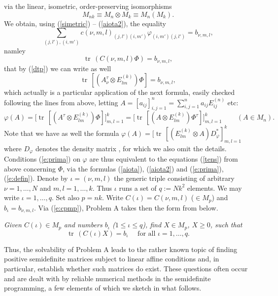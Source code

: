 \documentclass[12pt]{amsart}
\theoremstyle{definition}
\begin{document}
  via the linear, isometric, order-preserving isomorphisms $$ M_{nk}\equiv M_n \otimes M_k \equiv M_n (M_k ).$$
 We obtain, using (\ref{simetric}) -- (\ref{aiota2}), the equality
$$
\sum_{(j,l'),(i,m')}c(\nu ,m,l)_{(j,l')(i,m')}\varphi_{(i,m')(j,l')}=b_{\nu ,m,l},
$$
namley
$${\operatorname{tr}}\, (C(\nu ,m,l)\Phi )=b_{\nu ,m,l},
$$
that by  (\ref{dtp}) we can  write as well 
\begin{equation}\label{tens}
{\operatorname{tr}}\, [(A_{\nu}^\tau \otimes   E_{lm}^{(k)})\Phi ]=b_{\nu , m,l},
\end{equation}
which  actually is a particular application of the next formula, easily checked following the lines from above, 
letting $A=[a_{ij}]_{i,j=1}^n =\sum_{i,j=1}^n a_{ij}E_{ij}^{(n)}$ etc:
\begin{equation}\label{formm}
\varphi (A)=\big[ {\operatorname{tr}}\, [(A^\tau \otimes   E_{lm}^{(k)}){\Phi} ]\big]_{m,l=1}^k   =
\big[ {\operatorname{tr}}\, [(A \otimes   E_{lm}^{(k)}){\Phi^\tau} ]\big]_{m,l=1}^k 
 \, \mbox{ }\mbox{ }\mbox{ }(A\in M_n ).
\end{equation}
 Note that  we have  as well the formula $\varphi (A)=   [{\operatorname{tr}}\, [(E_{lm}^{(k)}\otimes A)D_{\varphi}^* ]_{m,l=1}^k$ where $D_\varphi$ denotes the density matrix \cite{prima},  for which we also omit the details.
Conditions (\ref{e:prima}) on $\varphi$ are thus equivalent to the equations (\ref{tens}) from 
above concerning $\Phi$, via the formulas (\ref{aiota}),  (\ref{aiota2}) and (\ref{e:prima}), (\ref{e:defin}). 
Denote by $\iota =(\nu ,m,l)$ the generic triple consisting of arbitrary $\nu =1,\ldots ,N$ and $m,l=1,\ldots ,k$.  Thus $\iota$ runs a set of $q:=Nk^2$ elements. We may   write
$\iota =1,\ldots ,q$. Set also $p=nk$. Write
$C(\iota )=C(\nu ,m,l)$ ($\in M_{p}$)
and  $b_\iota = b_{\nu, m,l}$. Via (\ref{e:cpmp}),
 Problem A takes then the form 
from below.
\vspace{3 mm}

 {\it Given  $C(\iota )\in M_p$ and numbers $b_\iota$ ($1\!\leq\!\iota \!\leq\! q$), find  $X \in M_p$, $X \geq 0$, such that
\begin{equation}\label{transl}
{\operatorname{tr}}\, (C(\iota )X)=b_\iota
\mbox{ }\mbox{  } \mbox{for all }\iota=1,\ldots,q .
\end{equation}
}
\vspace{3 mm}

\noindent Thus, the solvability of Problem  A leads to the rather known topic of finding  
positive semidefinite matrices subject to  linear affine conditions and, in particular, 
establish whether such matrices do exist.
These questions often occur and are dealt with by reliable numerical methods in the  
semidefinite programming, a few elements of which we sketch in what follows.
\end{document}
